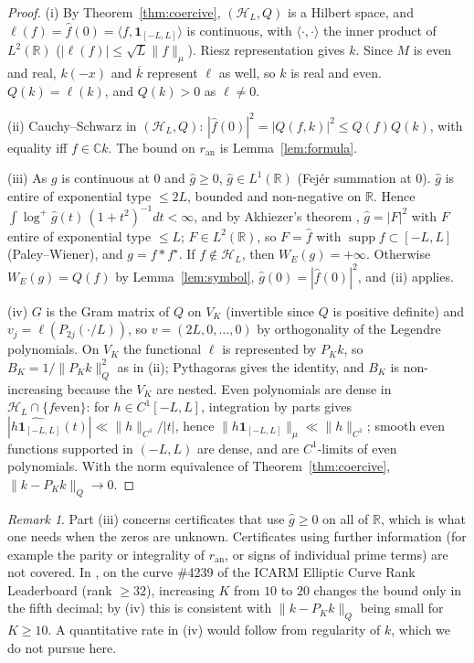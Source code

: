 \documentclass[11pt]{amsart}
\theoremstyle{definition}
\theoremstyle{remark}
\newtheorem*{remark}{Remark}
\newcommand{\R}{\mathbb{R}}
\newcommand{\C}{\mathbb{C}}
\newcommand{\ran}{r_{\mathrm{an}}}
\newcommand{\Hs}{\mathcal{H}_L}
\DeclareMathOperator{\supp}{supp}
\begin{document}
\begin{proof}
(i) By Theorem~\ref{thm:coercive}, $(\Hs,Q)$ is a Hilbert space, and $\ell(f)=\hat f(0)=\langle f,\mathbf 1_{[-L,L]}\rangle$
is continuous, with $\langle\cdot,\cdot\rangle$ the inner product of $L^2(\R)$ ($|\ell(f)|\le\sqrt L\|f\|_\mu$). Riesz representation gives $k$. Since $M$ is even and real, $k(-x)$ and
$\overline{k}$ represent $\ell$ as well, so $k$ is real and even. $Q(k)=\ell(k)$, and $Q(k)>0$ as $\ell\ne0$.

(ii) Cauchy--Schwarz in $(\Hs,Q)$: $|\hat f(0)|^2=|Q(f,k)|^2\le Q(f)Q(k)$, with equality iff $f\in\C k$. The bound on
$\ran$ is Lemma~\ref{lem:formula}.

(iii) As $g$ is continuous at $0$ and $\hat g\ge0$, $\hat g\in L^1(\R)$ (Fej\'er summation at $0$). $\hat g$ is entire of exponential type $\le2L$,
bounded and non-negative on $\R$. Hence $\int\log^+\hat g(t)\,(1+t^2)^{-1}dt<\infty$, and by Akhiezer's theorem \cite{Akhiezer,Boas}, $\hat g=|F|^2$ with $F$ entire of exponential
type $\le L$; $F\in L^2(\R)$, so $F=\hat f$ with $\supp f\subset[-L,L]$ (Paley--Wiener), and $g=f*f^\star$. If
$f\notin\Hs$, then $W_E(g)=+\infty$. Otherwise $W_E(g)=Q(f)$ by Lemma~\ref{lem:symbol}, $\hat g(0)=|\hat f(0)|^2$, and (ii)
applies.

(iv) $G$ is the Gram matrix of $Q$ on $V_K$ (invertible since $Q$ is positive definite) and $v_j=\ell(P_{2j}(\cdot/L))$, so $v=(2L,0,\dots,0)$ by orthogonality of the Legendre polynomials. On $V_K$ the functional $\ell$ is represented by $P_Kk$, so $B_K=1/\|P_Kk\|_Q^2$ as in (ii); Pythagoras gives
the identity, and $B_K$ is non-increasing because the $V_K$ are nested. Even polynomials are dense in $\Hs\cap\{f\text{
even}\}$: for $h\in C^1[-L,L]$, integration by parts gives $|\widehat{h\mathbf 1_{[-L,L]}}(t)|\ll\|h\|_{C^1}/|t|$, hence
$\|h\mathbf 1_{[-L,L]}\|_\mu\ll\|h\|_{C^1}$; smooth even functions supported in $(-L,L)$ are dense, and are $C^1$-limits of
even polynomials. With the norm equivalence of Theorem~\ref{thm:coercive}, $\|k-P_Kk\|_Q\to0$.
\end{proof}

\begin{remark}
Part (iii) concerns certificates that use $\hat g\ge0$ on all of $\R$, which is what one needs when the zeros are unknown.
Certificates using further information (for example the parity or integrality of $\ran$, or signs of individual prime
terms) are not covered. In \cite{Hac}, on the curve \#4239 of the ICARM Elliptic Curve Rank Leaderboard \cite{ICARM} (rank $\ge32$), increasing $K$
from $10$ to $20$ changes the bound only in the fifth decimal; by (iv) this is consistent with $\|k-P_Kk\|_Q$ being small
for $K\ge10$. A
quantitative rate in (iv) would follow from regularity of $k$, which we do not pursue here.
\end{remark}
\end{document}
